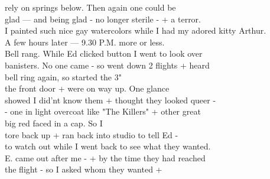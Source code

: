 \documentclass[11pt,a4paper]{article}
\begin{document}
{rely on springs below. Then again one could be \\
glad --- and being glad - no longer sterile - + a terror. \\
I painted such nice gay watercolors while I had my adored kitty Arthur. \\
\quad A few hours later --- 9.30 P.M. more or less. \\
\quad Bell rang. While Ed clicked button I went to look over \\
banisters. No one came - so went down 2 flights + heard \\
bell ring again, so started  the 3"  \\
the front door  + were on way up. One glance \\
showed I did'nt know them + thought they looked queer - \\
- one in light overcoat like "The Killers" + other great \\
big red faced  in a cap. So  I \\
tore back up + ran back into studio to tell Ed - \\
to watch out while I went back to see what they wanted. \\
E. came out after me - + by the time they had reached \\
the  flight - so I asked whom they wanted +}










\end{document}
